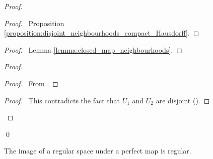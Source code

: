 \begin{proof}
    \pf
    \begin{proof}
        \pf\ Proposition \ref{proposition:disjoint_neighbourhoods_compact_Hausdorff}.
    \end{proof}
    \begin{proof}
        \pf\ Lemma \ref{lemma:closed_map_neighbourhoods},
    \end{proof}
    \begin{proof}
        \begin{proof}
            \pf\ From .
        \end{proof}
        \qedstep
        \begin{proof}
            \pf\ This contradicts the fact that $U_1$ and $U_2$ are disjoint ().
        \end{proof}
    \end{proof}
    \qed
\end{proof}

\begin{proposition}
    \label{proposition:perfect_image_regular}
    The image of a regular space under a perfect map is regular.
\end{proposition}

